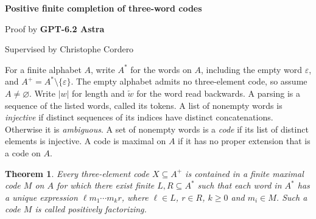 \documentclass[11pt,a4paper]{article}
\newtheorem*{mainthm}{Theorem}
\newcommand{\eps}{\varepsilon}
\newcommand{\rev}[1]{\overleftarrow{#1}}
\begin{document}
\begin{center}
  {\LARGE\bfseries Positive finite completion of three-word codes\par}
  \vspace{.65em}
  {\large Proof by \textbf{GPT-6.2 Astra}\par}
  \vspace{.15em}
  {\normalsize Supervised by Christophe Cordero\par}
\end{center}
\smallskip
For a finite alphabet $A$, write $A^*$ for the words on $A$, including the empty word $\eps$, and $A^+=A^*\setminus\{\eps\}$. The empty alphabet admits no three-element code, so assume $A\ne\varnothing$. Write $|w|$ for length and $\rev w$ for the word read backwards. A parsing is a sequence of the listed words, called its tokens. A list of nonempty words is \emph{injective} if distinct sequences of its indices have distinct concatenations. Otherwise it is \emph{ambiguous}. A set of nonempty words is a \emph{code} if its list of distinct elements is injective. A code is maximal on $A$ if it has no proper extension that is a code on $A$.
\begin{mainthm}
Every three-element code $X\subseteq A^+$ is contained in a finite maximal code $M$ on $A$ for which there exist finite $L,R\subseteq A^*$ such that each word in $A^*$ has a unique expression $\ell m_1\cdots m_k r$, where $\ell\in L$, $r\in R$, $k\ge0$ and $m_i\in M$. Such a code $M$ is called positively factorizing.
\end{mainthm}
\end{document}
